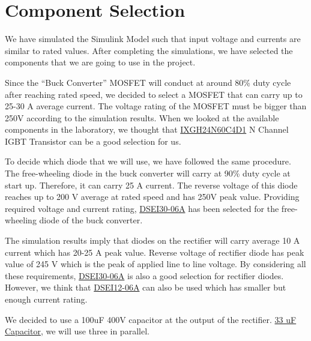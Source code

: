 \section{Component Selection}

We have simulated the Simulink Model such that input voltage and currents are similar to rated values. After completing the simulations, we have selected the components that we are going to use in the project.

Since the “Buck Converter” MOSFET will conduct at around 80\% duty cycle after reaching rated speed, we decided to select a MOSFET that can carry up to 25-30 A average current. The voltage rating of the MOSFET must be bigger than 250V according to the simulation results. When we looked at the available components in the laboratory, we thought that \href{http://ixapps.ixys.com/Datasheet/DS100254B(IXGH24N60C4D1).pdf}{IXGH24N60C4D1} N Channel IGBT Transistor can be a good selection for us. 

To decide which diode that we will use, we have followed the same procedure. The free-wheeling diode in the buck converter will carry at 90\% duty cycle at start up. Therefore, it can carry 25 A current. The reverse voltage of this diode reaches up to 200 V average at rated speed and has 250V peak value. Providing required voltage and current rating, \href{http://ixapps.ixys.com/DataSheet/DSEI30-06A.pdf}{DSEI30-06A} has been selected for the free-wheeling diode of the buck converter.

The simulation results imply that diodes on the rectifier will carry average 10 A current which has 20-25 A peak value. Reverse voltage of rectifier diode has peak value of 245 V which is the peak of applied line to line voltage. By considering all these requirements, \href{http://ixapps.ixys.com/DataSheet/DSEI30-06A.pdf}{DSEI30-06A} is also a good selection for rectifier diodes. However, we think that \href{http://ixapps.ixys.com/DataSheet/DSEI12-06A.pdf}{DSEI12-06A} can also be used which has smaller but enough current rating. 

We decided to use a 100uF 400V capacitor at the output of the rectifier. \href{https://www.nichicon.co.jp/english/products/pdfs/e-ucs.pdf}{33 uF Capacitor}, we will use three in parallel.
